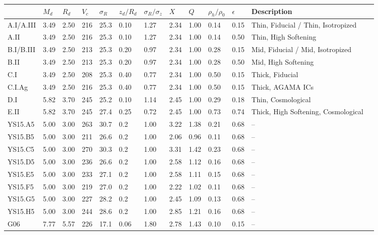 \begin{table}
\begin{tabular}{l l l l l l l l l l l l l}
\hline
 & $M_d$ & $R_d$ & $V_c$ & $\sigma_R$ & $z_d/R_d$  & $\sigma_R/\sigma_z$  & $X$ &  $Q$ & $\rho_h/\rho_0$ & $\epsilon$ & {Description}\\ 
\hline
A.I{/A.III}     & 3.49 & 2.50 & 216 & 25.3 & 0.10 & 1.27 & 2.34 & 1.00 & 0.14 & 0.15 & {Thin, Fiducial / Thin, Isotropized}\\
A.II    & 3.49 & 2.50 & 216 & 25.3 & 0.10 & 1.27 & 2.34 & 1.00 & 0.14 & 0.50 & {Thin, High Softening}\\
B.I{/B.III}     & 3.49 & 2.50 & 213 & 25.3 & 0.20 & 0.97 & 2.34 & 1.00 & 0.28 & 0.15 & {Mid, Fiducial / Mid, Isotropized}\\
B.II    & 3.49 & 2.50 & 213 & 25.3 & 0.20 & 0.97 & 2.34 & 1.00 & 0.28 & 0.50 & {Mid, High Softening}\\
C.I     & 3.49 & 2.50 & 208 & 25.3 & 0.40 & 0.77 & 2.34 & 1.00 & 0.50 & 0.15 & {Thick, Fiducial} \\
C.I.Ag  & 3.49 & 2.50 & 216 & 25.3 & 0.40 & 0.77 & 2.34 & 1.00 & 0.50 & 0.15 & {Thick, AGAMA ICs}\\
D.I    & 5.82 & 3.70 & 245 & 25.2 & 0.10 & 1.14 & 2.45 & 1.00 & 0.29 & 0.18  & {Thin, Cosmological}\\
E.II    & 5.82 & 3.70 & 245 & 27.4 & 0.25 & 0.72 & 2.45 & 1.00 & 0.73 & 0.74 & {Thick, High Softening, Cosmological}\\
\hline
YS15.A5 & 5.00 & 3.00 & 263 & 30.7  & 0.2 & 1.00 & 3.22 & 1.38 & 0.21 & 0.68 & {--}\\
YS15.B5 & 5.00 & 3.00 & 211 & 26.6  & 0.2 & 1.00 & 2.06 & 0.96 & 0.11 & 0.68 & {--}\\
YS15.C5 & 5.00 & 3.00 & 270 & 30.3  & 0.2 & 1.00 & 3.31 & 1.42 & 0.23 & 0.68 & {--}\\
YS15.D5 & 5.00 & 3.00 & 236 & 26.6  & 0.2 & 1.00 & 2.58 & 1.12 & 0.16 & 0.68 & {--}\\
YS15.E5 & 5.00 & 3.00 & 233 & 27.1  & 0.2 & 1.00 & 2.58 & 1.11 & 0.15 & 0.68 & {--}\\
YS15.F5 & 5.00 & 3.00 & 219 & 27.0  & 0.2 & 1.00 & 2.22 & 1.02 & 0.11 & 0.68 & {--}\\
YS15.G5 & 5.00 & 3.00 & 227 & 28.2  & 0.2 & 1.00 & 2.45 & 1.09 & 0.13 & 0.68 & {--}\\
YS15.H5 & 5.00 & 3.00 & 244 & 28.6  & 0.2 & 1.00 & 2.85 & 1.21 & 0.16 & 0.68 & {--}\\
\hline
G06     & 7.77 & 5.57 & 226 & 17.1  & 0.06  & 1.80 & 2.78 & 1.43 & 0.10 & 0.15 & {--}\\

\end{tabular}
\end{table}
